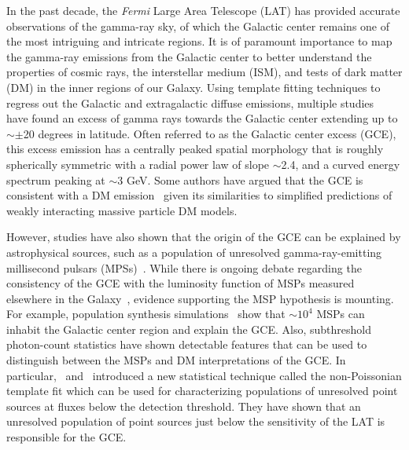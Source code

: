\documentclass[doublespace,nopageskip]{VTthesis}
\begin{document}
In the past decade, the \emph{Fermi} Large Area Telescope (LAT) has provided accurate observations of the gamma-ray sky, of which the Galactic center remains one of the most intriguing and intricate regions. It is of paramount importance to map the gamma-ray emissions from the Galactic center to better understand the properties of cosmic rays, the interstellar medium (ISM), and tests of dark matter (DM) in the inner regions of our Galaxy. Using template fitting techniques to regress out the Galactic and extragalactic diffuse emissions, multiple studies~\cite{2009arXiv0910.2998G,2009arXiv0912.3828V,2011PhLB..697..412H,2012PhRvD..86h3511A,2013PhRvD..88h3521G,2014PhRvD..89f3515M,2013PDU.....2..118H,2014PhRvD..90b3526A,2016PDU....12....1D,2015JCAP...03..038C,2015PhRvD..91l3010Z,2016ApJ...819...44A,2017ApJ...840...43A} have found an excess of gamma rays towards the Galactic center extending up to $\sim\pm$20 degrees in latitude. Often referred to as the Galactic center excess (GCE), this excess emission has a centrally peaked spatial morphology that is roughly spherically symmetric with a radial power law of slope $\sim$2.4, and a curved energy spectrum peaking at $\sim$3 GeV. Some authors have argued that the GCE is consistent with a DM emission~\cite{2009arXiv0910.2998G,2012PhRvD..86h3511A,2013PhRvD..88h3521G,2014PhRvD..89f3515M,2015JCAP...03..038C,2016PDU....12....1D} given its similarities to simplified predictions of weakly interacting massive particle DM models.

However, studies have also shown that the origin of the GCE can be explained by astrophysical sources, such as a population of unresolved gamma-ray-emitting millisecond pulsars (MPSs)~\cite{2011JCAP...03..010A,2012PhRvD..86h3511A,2013PhRvD..88h3521G,2014PhRvD..89f3515M,2015JCAP...03..038C,2016PDU....12....1D}. While there is ongoing debate regarding the consistency of the GCE with the luminosity function of MSPs measured elsewhere in the Galaxy~\cite{2015JCAP...06..043C, 2016JCAP...03..049H, 2017JCAP...08..015P, 2018MNRAS.481.3966B}, evidence supporting the MSP hypothesis is mounting. For example, population synthesis simulations~\cite{2018ApJ...863..199G} show that $\sim 10^4$ MSPs can inhabit the Galactic center region and explain the GCE. Also, subthreshold photon-count statistics have shown detectable features that can be used to distinguish between the MSPs and DM interpretations of the GCE. In particular,~\citet{2016PhRvL.116e1103L} and~\citet{2017AJ....153..253M} introduced a new statistical technique called the non-Poissonian template fit which can be used for characterizing populations of unresolved point sources at fluxes below the detection threshold. They have shown that an unresolved population of point sources just below the sensitivity of the LAT is responsible for the GCE.
\end{document}
